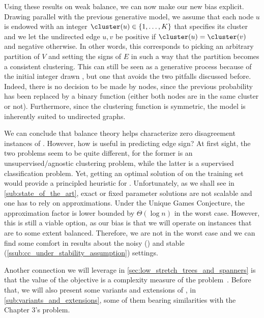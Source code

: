 \label{text:cc_new_bias}
Using these results on weak balance, we can now make our new bias explicit. Drawing parallel with
the previous generative model, we assume that each node $u$ is endowed with an integer $\cluster(u)
\in \{1, \ldots, K\}$ that specifies its cluster and we let the undirected edge $u,v$ be positive if
$\cluster(u) = \cluster(v)$ and negative otherwise. In other words, this corresponds to picking an
arbitrary partition of $V$ and setting the signs of $E$ in such a way that the partition becomes a
consistent clustering. This can still be seen as a generative process because of the initial integer
drawn \uar{}, but one that
avoids the two pitfalls discussed before. Indeed, there is no decision to be made by nodes, since
the previous probability has been replaced by a binary function (either both nodes are in the same
cluster or not). Furthermore, since the clustering function is symmetric, the model is inherently
suited to undirected graphs.

\iffalse
We can conclude that balance theory helps characterize zero disagreement instances of \pcc{}.
However, how is \pcc{} useful in predicting edge sign? At first sight, the two problems seem to be quite
different, for the former is an unsupervised/agnostic clustering problem, while the latter is a
supervised classification problem. Yet, getting an optimal solution of \pcc{} on the training set
would provide a principled heuristic for \esp{}. Unfortunately, as we shall see in
\autoref{sub:state_of_the_art}, exact or fixed parameter solutions are not scalable and one has to
rely on approximations. Under the Unique Games Conjecture, the approximation factor is lower bounded by
$\Theta(\log n)$ in the worst case. However, this is still a viable option, as our bias is that we
will operate on instances that are to some extent balanced. Therefore, we are not in the worst case
and we can find some comfort in results about the noisy () and
stable (\autoref{ssub:cc_under_stability_assumption}) settings.

Another connection we will leverage in \autoref{sec:low_stretch_trees_and_spanners} is that the
value of the \mind{} objective is a complexity measure of the \esp{} problem~\autocite[Section
4.1]{Cesa-Bianchi2012b}. Before that, we will also present some variants and extensions of \pcc{},
in \autoref{sub:variants_and_extensions}, some of them bearing similarities with the Chapter 3's problem.

